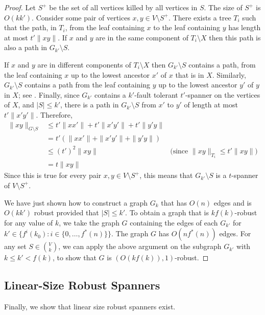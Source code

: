 \documentclass{patmorin}
\begin{document}
\begin{proof}
  Let $S^+$ be the set of all vertices killed by all vertices in $S$.
  The size of $S^+$ is $O(kk')$. Consider some pair of vertices $x,y\in
  V\setminus S^+$.  There exists a tree $T_i$ such that the path, in
  $T_i$, from the leaf containing $x$ to the leaf containing $y$ has
  length at most $t'\|xy\|$.  If $x$ and $y$ are in the same component of
  $T_i\setminus X$ then this path is also a path in $G_{k'}\setminus S$.

  If $x$ and $y$ are in different components of $T_i\setminus X$ then
  $G_{k'}\setminus S$ contains a path, from the leaf containing $x$
  up to the lowest ancestor $x'$ of $x$ that is in $X$.  Similarly,
  $G_{k'}\setminus S$ contains a path from the leaf containing $y$ up to
  the lowest ancestor $y'$ of $y$ in $X$; see .
  Finally, since $G_{k'}$ contains a $k'$-fault tolerant $t'$-spanner
  on the vertices of $X$, and $|S|\le k'$, there is a path in
  $G_{k'}\setminus S$ from $x'$ to $y'$ of length at most $t'\|x'y'\|$.
  Therefore,
  \begin{align*}
    \|xy\|_{G\setminus S} 
       & \le t'\|xx'\| + t'\|x'y'\| + t'\|y'y\| \\
       & = t'(\|xx'\| + \|x'y'\| + \|y'y\|) \\
       & \le (t')^2\|xy\| & \text{(since $\|xy\|_{T_i} \le t'\|xy\|$)} \\
       & = t\|xy\|
  \end{align*}
  Since this is true for every pair $x,y\in V\setminus S^+$, this means
  that $G_{k'}\setminus S$ is a $t$-spanner of $V\setminus S^+$.

  We have just shown how to construct a graph $G_k$ that has $O(n)$
  edges and is $O(kk')$ robust provided that $|S|\le k'$.  To obtain
  a graph that is $kf(k)$-robust for any value of $k$, we take the
  graph $G$ containing the edges of each $G_{k'}$ for $k'\in\{f^i(k_0) :
  i\in\{0,\ldots,f^*(n)\}\}$.  The graph $G$ has $O(nf^*(n))$ edges.
  For any set $S\in \binom{V}{k}$, we can apply the above argument
  on the subgraph $G_{k'}$ with $k \le k' < f(k)$, to show that $G$
  is $(O(kf(k)),1)$-robust.
\end{proof}

\subsection{Linear-Size Robust Spanners}

Finally, we show that linear size robust spanners exist.
\end{document}
